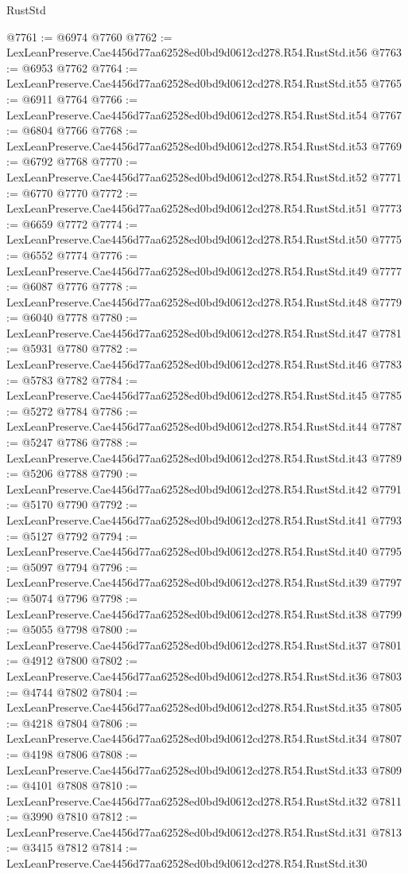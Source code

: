 \begin{lexlean}{RustStd}
\begin{coremodule}
@7761 := @6974 @7760
@7762 := LexLeanPreserve.Cae4456d77aa62528ed0bd9d0612cd278.R54.RustStd.it56
@7763 := @6953 @7762
@7764 := LexLeanPreserve.Cae4456d77aa62528ed0bd9d0612cd278.R54.RustStd.it55
@7765 := @6911 @7764
@7766 := LexLeanPreserve.Cae4456d77aa62528ed0bd9d0612cd278.R54.RustStd.it54
@7767 := @6804 @7766
@7768 := LexLeanPreserve.Cae4456d77aa62528ed0bd9d0612cd278.R54.RustStd.it53
@7769 := @6792 @7768
@7770 := LexLeanPreserve.Cae4456d77aa62528ed0bd9d0612cd278.R54.RustStd.it52
@7771 := @6770 @7770
@7772 := LexLeanPreserve.Cae4456d77aa62528ed0bd9d0612cd278.R54.RustStd.it51
@7773 := @6659 @7772
@7774 := LexLeanPreserve.Cae4456d77aa62528ed0bd9d0612cd278.R54.RustStd.it50
@7775 := @6552 @7774
@7776 := LexLeanPreserve.Cae4456d77aa62528ed0bd9d0612cd278.R54.RustStd.it49
@7777 := @6087 @7776
@7778 := LexLeanPreserve.Cae4456d77aa62528ed0bd9d0612cd278.R54.RustStd.it48
@7779 := @6040 @7778
@7780 := LexLeanPreserve.Cae4456d77aa62528ed0bd9d0612cd278.R54.RustStd.it47
@7781 := @5931 @7780
@7782 := LexLeanPreserve.Cae4456d77aa62528ed0bd9d0612cd278.R54.RustStd.it46
@7783 := @5783 @7782
@7784 := LexLeanPreserve.Cae4456d77aa62528ed0bd9d0612cd278.R54.RustStd.it45
@7785 := @5272 @7784
@7786 := LexLeanPreserve.Cae4456d77aa62528ed0bd9d0612cd278.R54.RustStd.it44
@7787 := @5247 @7786
@7788 := LexLeanPreserve.Cae4456d77aa62528ed0bd9d0612cd278.R54.RustStd.it43
@7789 := @5206 @7788
@7790 := LexLeanPreserve.Cae4456d77aa62528ed0bd9d0612cd278.R54.RustStd.it42
@7791 := @5170 @7790
@7792 := LexLeanPreserve.Cae4456d77aa62528ed0bd9d0612cd278.R54.RustStd.it41
@7793 := @5127 @7792
@7794 := LexLeanPreserve.Cae4456d77aa62528ed0bd9d0612cd278.R54.RustStd.it40
@7795 := @5097 @7794
@7796 := LexLeanPreserve.Cae4456d77aa62528ed0bd9d0612cd278.R54.RustStd.it39
@7797 := @5074 @7796
@7798 := LexLeanPreserve.Cae4456d77aa62528ed0bd9d0612cd278.R54.RustStd.it38
@7799 := @5055 @7798
@7800 := LexLeanPreserve.Cae4456d77aa62528ed0bd9d0612cd278.R54.RustStd.it37
@7801 := @4912 @7800
@7802 := LexLeanPreserve.Cae4456d77aa62528ed0bd9d0612cd278.R54.RustStd.it36
@7803 := @4744 @7802
@7804 := LexLeanPreserve.Cae4456d77aa62528ed0bd9d0612cd278.R54.RustStd.it35
@7805 := @4218 @7804
@7806 := LexLeanPreserve.Cae4456d77aa62528ed0bd9d0612cd278.R54.RustStd.it34
@7807 := @4198 @7806
@7808 := LexLeanPreserve.Cae4456d77aa62528ed0bd9d0612cd278.R54.RustStd.it33
@7809 := @4101 @7808
@7810 := LexLeanPreserve.Cae4456d77aa62528ed0bd9d0612cd278.R54.RustStd.it32
@7811 := @3990 @7810
@7812 := LexLeanPreserve.Cae4456d77aa62528ed0bd9d0612cd278.R54.RustStd.it31
@7813 := @3415 @7812
@7814 := LexLeanPreserve.Cae4456d77aa62528ed0bd9d0612cd278.R54.RustStd.it30

\end{coremodule}
\end{lexlean}
